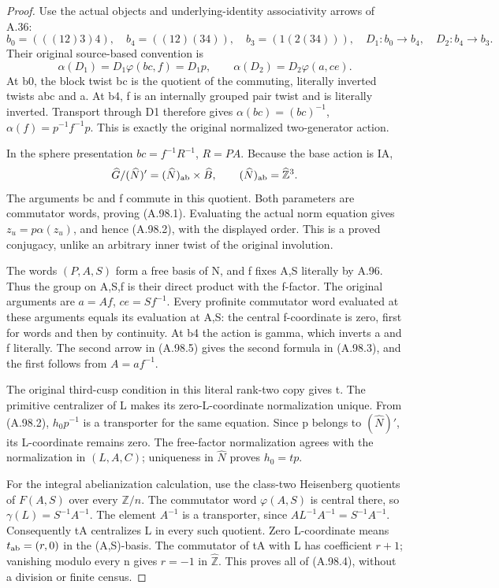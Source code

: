 \begin{proof}
Use the actual objects and underlying-identity associativity arrows
of A.36:
\[
 b_0=(((12)3)4),\quad b_4=((12)(34)),\quad b_3=(1(2(34))),
 \quad D_1:b_0\to b_4,\quad D_2:b_4\to b_3.
\]
Their original source-based convention is
\[
 \alpha(D_1)=D_1\varphi(bc,f)=D_1p,
 \qquad \alpha(D_2)=D_2\varphi(a,ce).
 \tag{A.98.5}
\]
At b0, the block twist bc is the quotient of the commuting,
literally inverted twists abc and a. At b4, f is an internally
grouped pair twist and is literally inverted. Transport through D1
therefore gives
\(\alpha(bc)=(bc)^{-1}\), \(\alpha(f)=p^{-1}f^{-1}p\).
This is exactly the original normalized two-generator action.

In the sphere presentation \(bc=f^{-1}R^{-1}\), \(R=PA\).
Because the base action is IA,
\[
 \widehat G/(\widehat N)'
       =(\widehat N)_{\rm ab}\times\widehat B,
 \qquad (\widehat N)_{\rm ab}=\widehat{\mathbb Z}^{3}.
\]
The arguments bc and f commute in this quotient. Both parameters
are commutator words, proving (A.98.1). Evaluating the actual norm
equation gives \(z_u=p\alpha(z_u)\), and hence (A.98.2), with
the displayed order. This is a proved conjugacy, unlike an arbitrary
inner twist of the original involution.

The words \((P,A,S)\) form a free basis of N, and f fixes A,S
literally by A.96. Thus the group on A,S,f is their direct product
with the f-factor. The original arguments are
\(a=Af\), \(ce=Sf^{-1}\). Every profinite commutator word
evaluated at these arguments equals its evaluation at A,S: the
central f-coordinate is zero, first for words and then by continuity.
At b4 the action is gamma, which inverts a and f literally.
The second arrow in (A.98.5) gives the second formula in
(A.98.3), and the first follows from \(A=af^{-1}\).

The original third-cusp condition in this literal rank-two copy
gives t. The primitive centralizer of L makes its zero-L-coordinate
normalization unique. From (A.98.2), \(h_0p^{-1}\) is a
transporter for the same equation. Since p belongs to
\((\widehat N)'\), its L-coordinate remains zero. The free-factor
normalization agrees with the normalization in \((L,A,C)\);
uniqueness in \(\widehat N\) proves \(h_0=tp\).

For the integral abelianization calculation, use the class-two
Heisenberg quotients of \(F(A,S)\) over every \(\mathbb Z/n\).
The commutator word \(\varphi(A,S)\) is central there, so
\(\gamma(L)=S^{-1}A^{-1}\). The element \(A^{-1}\) is a
transporter, since \(AL^{-1}A^{-1}=S^{-1}A^{-1}\).
Consequently tA centralizes L in every such quotient. Zero
L-coordinate means \(t_{\rm ab}=(r,0)\) in the (A,S)-basis.
The commutator of tA with L has coefficient \(r+1\); vanishing
modulo every n gives \(r=-1\) in \(\widehat{\mathbb Z}\).
This proves all of (A.98.4), without a division or finite census.


\end{proof}
